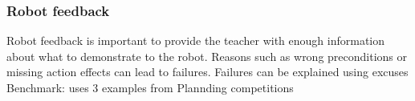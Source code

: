 \subsubsection{Robot feedback}
Robot feedback is important to provide the teacher with enough information about what to demonstrate to the robot.
Reasons such as wrong preconditions or missing action effects can lead to failures.
Failures can be explained using excuses \cite{?}
Benchmark: \cite{martinez2017relational} uses 3 examples from Plannding competitions



